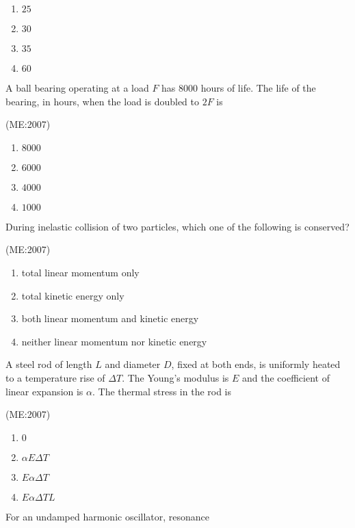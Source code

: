 



\begin{multicols}{4}
\begin{enumerate}
    \item $25$
    \item $30$
    \item $35$
    \item $60$
\end{enumerate}
\end{multicols}

\item A ball bearing operating at a load $F$ has 8000 hours of life. The life of the bearing, in hours, when the load is doubled to $2F$ is

	\hfill{(ME:2007)}
\begin{multicols}{2}
\begin{enumerate}
    \item $8000$
    \item $6000$
    \item $4000$
    \item $1000$
\end{enumerate}
\end{multicols}

\item During inelastic collision of two particles, which one of the following is conserved? 

	\hfill{(ME:2007)}
\begin{multicols}{1}
\begin{enumerate}
    \item total linear momentum only
    \item total kinetic energy only
    \item both linear momentum and kinetic energy
    \item neither linear momentum nor kinetic energy
\end{enumerate}
\end{multicols}

\item A steel rod of length $L$ and diameter $D$, fixed at both ends, is uniformly heated to a temperature rise of $\Delta T$. The Young's modulus is $E$ and the coefficient of linear expansion is $\alpha$. The thermal stress in the rod is

	\hfill{(ME:2007)}
	\begin{multicols}{2}
\begin{enumerate}
    \item $0$
    \item $\alpha E \Delta T$
    \item $E \alpha \Delta T$
    \item $E \alpha \Delta T L$
\end{enumerate}
\end{multicols}
\item For an undamped harmonic oscillator, resonance 

